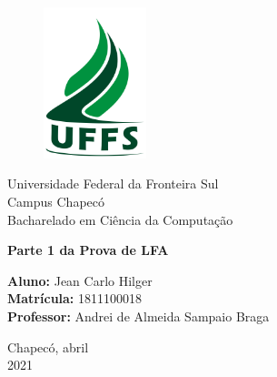 \documentclass[a4paper, 12pt]{article}
\begin{document}

\begin{titlepage}
	\begin{center}
    	\begin{figure}[!ht]
        	\centering
        	\includegraphics[width=3cm]{./imgs/uffs.png}
    	\end{figure}
    
    	\Huge{Universidade Federal da Fronteira Sul}\\
    	\large{Campus Chapecó}\\ 
    	\large{Bacharelado em Ciência da Computação}\\ 
    	
    	\vspace{15pt}
        \vspace{95pt}
        
        \textbf{\LARGE{Parte 1 da Prova de LFA}}\\
    	
        \vspace{3,5cm}
	\end{center}
	
	\begin{flushleft}
	    \begin{tabbing}
			\textbf{Aluno:} Jean Carlo Hilger \\
			\textbf{Matrícula:} 1811100018 \\
			\textbf{Professor:} Andrei de Almeida Sampaio Braga \\
        \end{tabbing}
    \end{flushleft}
	
	\vspace{1cm}
	
	\begin{center}
		\vspace{\fill}
		Chapecó, abril\\
		2021
	\end{center}
\end{titlepage}
\end{document}
